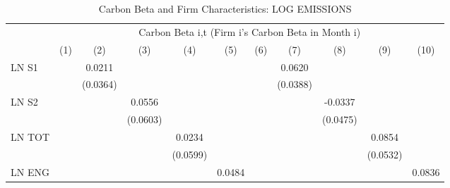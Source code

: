 \begin{table}[htbp]\centering
\def\sym#1{\ifmmode^{#1}\else\(^{#1}\)\fi}
\caption{Carbon Beta and Firm Characteristics: LOG EMISSIONS}
\begin{tabular}{l*{10}{c}}
\hline\hline
                &\multicolumn{10}{c}{Carbon Beta i,t (Firm i's Carbon Beta in Month i)}                                                                                                                       \\\cmidrule(lr){2-11}
                &\multicolumn{1}{c}{(1)}         &\multicolumn{1}{c}{(2)}         &\multicolumn{1}{c}{(3)}         &\multicolumn{1}{c}{(4)}         &\multicolumn{1}{c}{(5)}         &\multicolumn{1}{c}{(6)}         &\multicolumn{1}{c}{(7)}         &\multicolumn{1}{c}{(8)}         &\multicolumn{1}{c}{(9)}         &\multicolumn{1}{c}{(10)}         \\
\hline
LN S1           &                  &   0.0211         &                  &                  &                  &                  &   0.0620         &                  &                  &                  \\
                &                  & (0.0364)         &                  &                  &                  &                  & (0.0388)         &                  &                  &                  \\
LN S2           &                  &                  &   0.0556         &                  &                  &                  &                  &  -0.0337         &                  &                  \\
                &                  &                  & (0.0603)         &                  &                  &                  &                  & (0.0475)         &                  &                  \\
LN TOT          &                  &                  &                  &   0.0234         &                  &                  &                  &                  &   0.0854         &                  \\
                &                  &                  &                  & (0.0599)         &                  &                  &                  &                  & (0.0532)         &                  \\
LN ENG          &                  &                  &                  &                  &   0.0484         &                  &                  &                  &                  &   0.0836         \\

\end{tabular}
\end{table}
